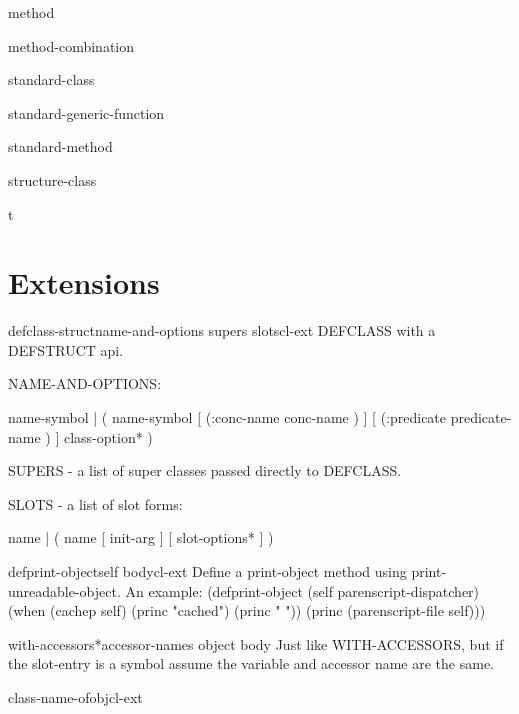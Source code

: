 \begin{class}{method}{}{}{}
  
\end{class}

\begin{class}{method-combination}{}{}{}
  
\end{class}

\begin{class}{standard-class}{}{}{}
  
\end{class}

\begin{class}{standard-generic-function}{}{}{}
  
\end{class}

\begin{class}{standard-method}{}{}{}
  
\end{class}

\begin{class}{structure-class}{}{}{}
  
\end{class}

\begin{class}{t}{}{}{}
  
\end{class}

\section{Extensions}
\label{sec:extensions}

\begin{macro}{defclass-struct}{name-and-options supers \rest slots}{cl-ext}{}
  DEFCLASS with a DEFSTRUCT api.

NAME-AND-OPTIONS:

  name-symbol |
  ( name-symbol [ (:conc-name conc-name ) ]
                [ (:predicate predicate-name ) ]
                class-option* )

SUPERS - a list of super classes passed directly to DEFCLASS.

SLOTS - a list of slot forms:

  name |
  ( name [ init-arg ] [ slot-options* ] )
\end{macro}

\begin{macro}{defprint-object}{self \body body}{cl-ext}{}
  Define a print-object method using print-unreadable-object.
  An example:
  (defprint-object (self parenscript-dispatcher)
    (when (cachep self)
      (princ "cached")
      (princ " "))
    (princ (parenscript-file self)))
\end{macro}

\begin{macro}{with-accessors*}{accessor-names object \body body}{}{}
  Just like WITH-ACCESSORS, but if the slot-entry is a symbol assume
  the variable and accessor name are the same.
\end{macro}

\begin{function}{class-name-of}{obj}{cl-ext}{}
  
\end{function}

